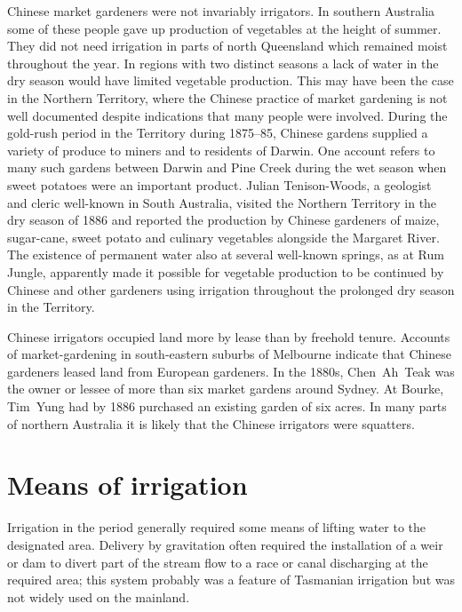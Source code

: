 Chinese market gardeners were not invariably irrigators.  In southern
Australia some of these people gave up production of vegetables at the
height of summer.  They did not need irrigation in parts of north
Queensland  which remained moist throughout the
year.  In regions with two distinct seasons a lack of water in the dry
season would have limited vegetable production.  This may have been
the case in the Northern Territory,  where
the Chinese practice of market gardening is not well documented
despite indications that many people were involved.  During the
gold-rush period in the Territory during 1875--85, Chinese gardens
supplied a variety of produce to miners and to residents of Darwin.
One account refers to many such gardens between Darwin 
and Pine Creek  during the wet season when sweet
potatoes were an important product.  Julian Tenison-Woods,
 a geologist
and cleric well-known in South Australia, visited the Northern
Territory in the dry season of 1886 and reported the production by
Chinese gardeners of maize, sugar-cane, sweet potato and culinary
vegetables alongside the Margaret River.  The
existence of permanent water also at several well-known springs, as at
Rum Jungle,  apparently made it possible for
vegetable production to be continued by Chinese and other gardeners
using irrigation throughout the prolonged dry season in the
Territory.

Chinese  irrigators occupied land more by lease than by
freehold ten\-ure.  Accounts of market-gardening in south-eastern
suburbs of Melbourne  indicate that Chinese gardeners
leased land from European gardeners.  In the 1880s, Chen~Ah~Teak
 was the owner or lessee of more than six market
gardens around Sydney.  At Bourke, Tim~Yung  had by
1886 purchased an existing garden of six acres.  In many parts of
northern Australia it is likely that the Chinese irrigators were
squatters.

\section*{Means of irrigation}

Irrigation in the period generally required some means of lifting
water to the designated area.  Delivery by gravitation  often required the installation of a weir or dam 
 to divert part
of the stream flow to a race or canal discharging at the required
area; this system probably was a feature of Tasmanian irrigation but
was not widely used on the mainland.

